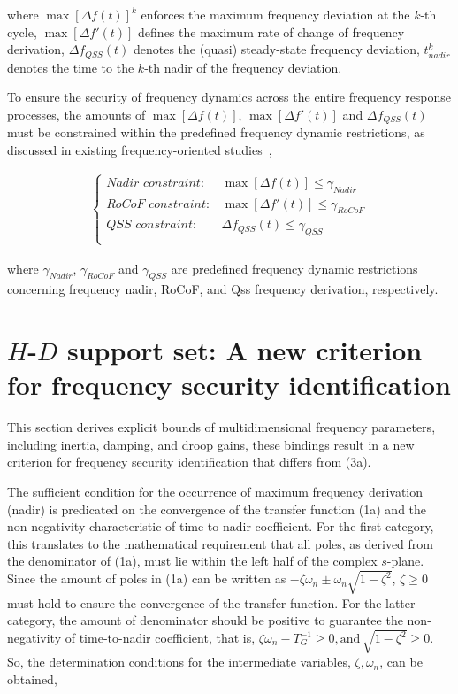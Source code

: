\documentclass[lettersize,journal]{IEEEtran}
\begin{document}
\noindent
where $\max [\varDelta f(t)]^k$ enforces the maximum frequency deviation at the $k$-th cycle, $\max [\varDelta f'(t)]$ defines the maximum rate of change of frequency derivation, $\varDelta f_{QSS} (t)$ denotes the (quasi) steady-state frequency deviation, $t_{nadir}^k$ denotes the time to the $k$-th nadir of the frequency deviation.


To ensure the security of frequency dynamics across the entire frequency response processes, the amounts of $\max[\varDelta f(t)]$, $\max[\varDelta f'(t)]$ and $\varDelta f_{QSS}(t)$ must be constrained within the predefined frequency dynamic restrictions, as discussed in existing frequency-oriented studies~\cite{9765359,10554988,10819485,10820061,10938039},

\vspace{-0.25cm}
\begin{subequations}
  \begin{align}
  \left \{
  \begin{array}{rr}
  {Nadir\,\, constraint:}& \max[\varDelta f (t)] \leq \gamma_{Nadir}\\
  {RoCoF\,\, constraint:}&\max[\varDelta f' (t)] \leq \gamma_{RoCoF}\\
  {QSS\,\, constraint:} &\varDelta f_{QSS} (t) \leq \gamma_{QSS}\\
\end{array}
\right.
    \end{align}
  \end{subequations}

  \noindent
where $\gamma_{Nadir}$, $\gamma_{RoCoF}$ and $\gamma_{QSS}$ are predefined frequency dynamic restrictions concerning frequency nadir, RoCoF, and Qss frequency derivation, respectively.

\section{$H$-$D$ support set: A new criterion for frequency security identification}

This section derives explicit bounds of multidimensional frequency parameters, including inertia, damping, and droop gains, these bindings result in a new criterion for frequency security identification that differs from (3a).

The sufficient condition for the occurrence of maximum frequency derivation (nadir) is predicated on the convergence of the transfer function (1a) and the non-negativity characteristic of time-to-nadir coefficient. For the first category, this translates to the mathematical requirement that all poles, as derived from the denominator of (1a), must lie within the left half of the complex $s$-plane. Since the amount of poles in (1a) can be written as $-\zeta \omega_n \pm \omega_n \sqrt{1 - \zeta^2}$, $\zeta \geq 0$ must hold to ensure the convergence of the transfer function. For the latter category, the amount of denominator should be positive to guarantee the non-negativity of time-to-nadir coefficient, that is, $\zeta \omega_n - T_G^{-1}\geq 0, \text{and}\, \sqrt{1-\zeta^2} \geq 0$. So, the determination conditions for the intermediate variables, $\zeta, \omega_n$, can be obtained,
\end{document}

